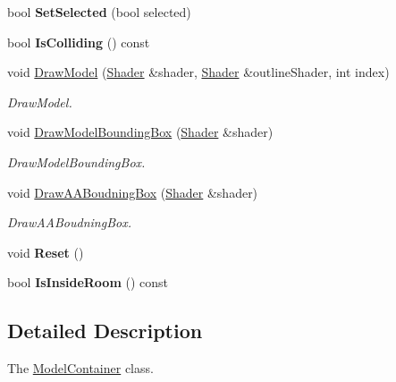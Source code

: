 \begin{DoxyCompactItemize}
\item 
\hypertarget{class_model_container_a56c9edb4f2eb179a213e639dbaa05c9e}{}bool {\bfseries Set\+Selected} (bool selected)\label{class_model_container_a56c9edb4f2eb179a213e639dbaa05c9e}

\item 
\hypertarget{class_model_container_ad772dd3ae73fa1f3237c83e97a5fc80b}{}bool {\bfseries Is\+Colliding} () const \label{class_model_container_ad772dd3ae73fa1f3237c83e97a5fc80b}

\item 
void \hyperlink{class_model_container_a9d6352f35e74be676bf923d38ec0b24c}{Draw\+Model} (\hyperlink{class_shader}{Shader} \&shader, \hyperlink{class_shader}{Shader} \&outline\+Shader, int index)
\begin{DoxyCompactList}\small\item\em Draw\+Model. \end{DoxyCompactList}\item 
void \hyperlink{class_model_container_a4f73480431ca9bca8cbcdac87ef1d055}{Draw\+Model\+Bounding\+Box} (\hyperlink{class_shader}{Shader} \&shader)
\begin{DoxyCompactList}\small\item\em Draw\+Model\+Bounding\+Box. \end{DoxyCompactList}\item 
void \hyperlink{class_model_container_a6048f0f26f86025c6854bf42d7c5cc19}{Draw\+A\+A\+Boudning\+Box} (\hyperlink{class_shader}{Shader} \&shader)
\begin{DoxyCompactList}\small\item\em Draw\+A\+A\+Boudning\+Box. \end{DoxyCompactList}\item 
\hypertarget{class_model_container_aff6393883a26f3d71476e24e34f58852}{}void {\bfseries Reset} ()\label{class_model_container_aff6393883a26f3d71476e24e34f58852}

\item 
\hypertarget{class_model_container_a84dee4d7878153ecd2971427b2dd4c87}{}bool {\bfseries Is\+Inside\+Room} () const \label{class_model_container_a84dee4d7878153ecd2971427b2dd4c87}

\end{DoxyCompactItemize}


\subsection{Detailed Description}
The \hyperlink{class_model_container}{Model\+Container} class. 

